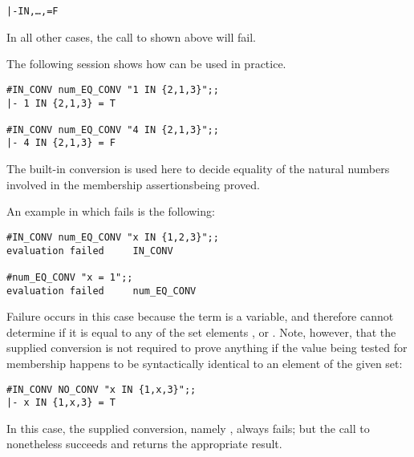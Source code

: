\begin{hol}\begin{alltt}
   |-  IN \lb{},\dots,\rb = F
\end{alltt}\end{hol}

\noindent In all other cases, the call to  shown above will fail.

The following session shows how  can be used in practice.

\setcounter{sessioncount}{1}
\begin{session}\begin{verbatim}
#IN_CONV num_EQ_CONV "1 IN {2,1,3}";;
|- 1 IN {2,1,3} = T

#IN_CONV num_EQ_CONV "4 IN {2,1,3}";;
|- 4 IN {2,1,3} = F
\end{verbatim}\end{session}

\noindent The built-in conversion  is used here to decide
equality of the natural numbers involved in the membership
assertions\pagebreak[3] being proved.

An example in which  fails is the following:

\begin{session}\begin{verbatim}
#IN_CONV num_EQ_CONV "x IN {1,2,3}";;
evaluation failed     IN_CONV

#num_EQ_CONV "x = 1";;
evaluation failed     num_EQ_CONV
\end{verbatim}\end{session}

\noindent Failure occurs in this case because the term  is a variable,
and  therefore cannot determine if it is equal to any of the
set elements ,  or .  Note, however, that the supplied
conversion is not required to prove anything if the value being tested for
membership happens to be syntactically identical to an element of the given
set:

\begin{session}\begin{verbatim}
#IN_CONV NO_CONV "x IN {1,x,3}";;
|- x IN {1,x,3} = T
\end{verbatim}\end{session}

\noindent In this case, the supplied conversion, namely , always
fails; but the call to  nonetheless succeeds and returns the
appropriate result.%

